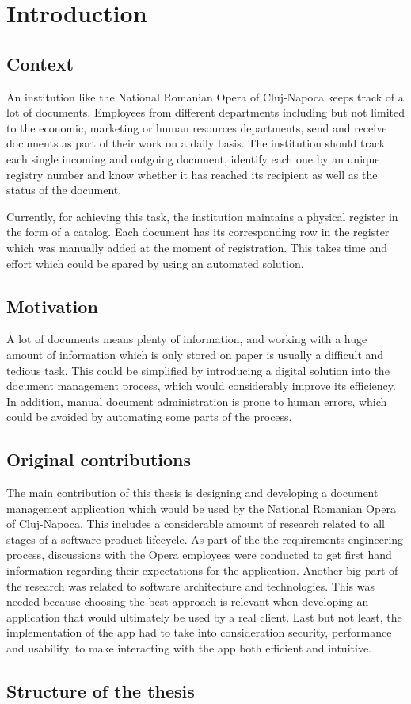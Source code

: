 \chapter{Introduction}
\label{chapter:introduction}

\section{Context}
\label{section:context}

An institution like the National Romanian Opera of Cluj-Napoca keeps track of a lot of documents.
Employees from different departments including but not limited to the economic, marketing or human resources departments, send and receive documents as part of their work on a daily basis. The institution should track each single incoming and outgoing document, identify each one by an unique registry number and know whether it has reached its recipient as well as the status of the document.

Currently, for achieving this task, the institution maintains a physical register in the form of a catalog. Each document has its corresponding row in the register which was manually added at the moment of registration. This takes time and effort which could be spared by using an automated solution.

\section{Motivation}
\label{section:motivation}

A lot of documents means plenty of information, and working with a huge amount of information which is only stored on paper is usually a difficult and tedious task. This could be simplified by introducing a digital solution into the document management process, which would considerably improve its efficiency. In addition, manual document administration is prone to human errors, which could be avoided by automating some parts of the process.



\section{Original contributions}
\label{section:originalContributions}

The main contribution of this thesis is designing and developing a document management application which would be used by the National Romanian Opera of Cluj-Napoca. This includes a considerable amount of research related to all stages of a software product lifecycle. As part of the the requirements engineering process, discussions with the Opera employees were conducted to get first hand information regarding their expectations for the application. Another big part of the research was related to software architecture and technologies. This was needed because choosing the best approach is relevant when developing an application that would ultimately be used by a real client. Last but not least, the implementation of the app had to take into consideration security, performance and usability, to make interacting with the app both efficient and intuitive.

\section{Structure of the thesis}
\label{section:structureOfTheThesis}


